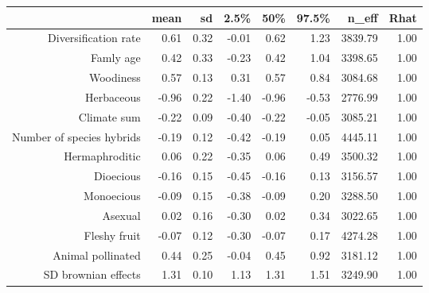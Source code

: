 \begin{table}[ht]
\centering
\begin{tabular}{rrrrrrrr}
  \hline
 & mean & sd & 2.5\% & 50\% & 97.5\% & n\_eff & Rhat \\ 
  \hline
Diversification rate & 0.61 & 0.32 & -0.01 & 0.62 & 1.23 & 3839.79 & 1.00 \\ 
  Famly age & 0.42 & 0.33 & -0.23 & 0.42 & 1.04 & 3398.65 & 1.00 \\ 
  Woodiness & 0.57 & 0.13 & 0.31 & 0.57 & 0.84 & 3084.68 & 1.00 \\ 
  Herbaceous & -0.96 & 0.22 & -1.40 & -0.96 & -0.53 & 2776.99 & 1.00 \\ 
  Climate sum & -0.22 & 0.09 & -0.40 & -0.22 & -0.05 & 3085.21 & 1.00 \\ 
  Number of species hybrids & -0.19 & 0.12 & -0.42 & -0.19 & 0.05 & 4445.11 & 1.00 \\ 
  Hermaphroditic & 0.06 & 0.22 & -0.35 & 0.06 & 0.49 & 3500.32 & 1.00 \\ 
  Dioecious & -0.16 & 0.15 & -0.45 & -0.16 & 0.13 & 3156.57 & 1.00 \\ 
  Monoecious & -0.09 & 0.15 & -0.38 & -0.09 & 0.20 & 3288.50 & 1.00 \\ 
  Asexual & 0.02 & 0.16 & -0.30 & 0.02 & 0.34 & 3022.65 & 1.00 \\ 
  Fleshy fruit & -0.07 & 0.12 & -0.30 & -0.07 & 0.17 & 4274.28 & 1.00 \\ 
  Animal pollinated & 0.44 & 0.25 & -0.04 & 0.45 & 0.92 & 3181.12 & 1.00 \\ 
  SD brownian effects & 1.31 & 0.10 & 1.13 & 1.31 & 1.51 & 3249.90 & 1.00 \\ 
   \hline
\end{tabular}
\end{table}
